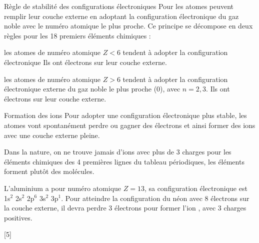 \begin{doc}{Règle de stabilité des configurations électroniques}
  Pour  les atomes peuvent remplir leur couche externe en adoptant la configuration électronique du gaz noble avec le numéro atomique le plus proche.
  Ce principe se décompose en deux règles pour les 18 premiers éléments chimiques :
  
  \begin{importants}
    \pointCyan {} les atomes de numéro atomique $Z < 6$
    tendent à adopter la configuration électronique
    Ils ont  électrons sur leur couche externe. 
    \bigskip
    
    \pointCyan {} les atomes de numéro atomique $Z > 6$
    tendent à adopter la configuration électronique externe du gaz noble le plus proche
    \texteTrou(0){, avec $n = 2,3$.}
    Ils ont  électrons sur leur couche externe.
  \end{importants}
\end{doc}


\begin{doc}{Formation des ions}
  Pour adopter une configuration électronique plus stable, les atomes vont spontanément perdre ou gagner des électrons et ainsi former des ions avec une couche externe pleine.

  \hfill \textcolor{couleurSec}{\faLevelDown*}

  \begin{importants}
    \attention Dans la nature, on ne trouve jamais d'ions avec plus de 3 charges pour les éléments chimiques des 4 premières lignes du tableau périodiques, les éléments forment plutôt des molécules.
  \end{importants}

  \exemple L'aluminium a pour numéro atomique $Z = 13$, sa configuration électronique est 1s$^2$ 2s$^2$ 2p$^6$ 3s$^2$ 3p$^1$.
  Pour atteindre la configuration du néon avec 8 électrons sur la couche externe, il devra perdre 3 électrons pour former l'ion , avec 3 charges positives.
\end{doc}

[5]


